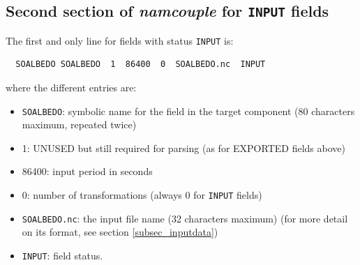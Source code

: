 \subsection{Second section of {\it namcouple} for {\tt INPUT} fields}
\label{subsubsec_secondINPUT}

The first and only line for fields with status {\tt INPUT} is:

  \begin{verbatim}
  SOALBEDO SOALBEDO  1  86400  0  SOALBEDO.nc  INPUT
  \end{verbatim}
\vspace{-0.5cm}
where the different entries are:
\begin{itemize}
\item {\tt SOALBEDO}: symbolic name for the field in the target component
  (80 characters maximum, repeated twice)
\item 1: UNUSED but still required for parsing (as for
  EXPORTED fields above)
\item 86400: input period in seconds
\item 0: number of transformations (always 0 for {\tt INPUT} fields)
\item {\tt SOALBEDO.nc}:  the input file name (32 characters maximum)
  (for more detail on its format, see section \ref{subsec_inputdata})
\item {\tt INPUT}: field status.
\end{itemize}

